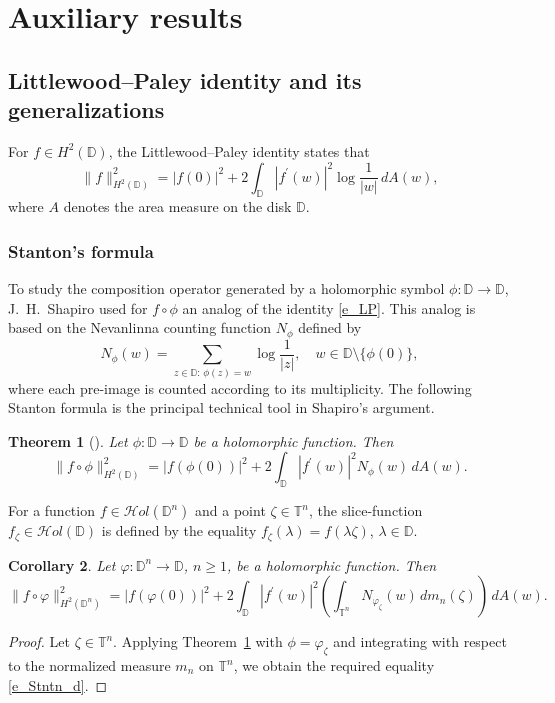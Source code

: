 \documentclass{amsart}
\numberwithin{equation}{section}
\newtheorem{theorem}{Theorem}[section]
\newtheorem{corollary}[theorem]{Corollary}
\theoremstyle{definition}
\newcommand{\neva}{N}
\newcommand{\aream}{A}
\newcommand{\meal}{m_n}
\newcommand{\za}{\zeta}
\newcommand{\ph}{\varphi}
\newcommand{\hol}{\mathcal{H}ol}
\newcommand{\Dbb}{\mathbb D}
\newcommand{\tn}{\mathbb{T}^n}
\newcommand{\dn}{\mathbb{D}^n}
\begin{document}
\section{Auxiliary results}\label{s_aux}
\subsection{Littlewood--Paley identity and its generalizations}\label{ss_HL}

For $f\in H^2(\Dbb)$, the Little\-wood--Paley identity states that
\begin{equation}\label{e_LP}
\|f\|^2_{H^2(\Dbb)} = |f(0)|^2 + 2\int_{\Dbb} |f^\prime(w)|^2 \log\frac{1}{|w|}\, d\aream(w),
\end{equation}
where $\aream$ denotes the area measure on the disk $\Dbb$.


\subsubsection*{Stanton's formula}
To study the composition operator generated by a holomorphic symbol $\phi:\Dbb \to \Dbb$,
J.~H.~Shapiro \cite{ShJoel87} used for $f\circ\phi$ an analog of the identity \eqref{e_LP}.
This analog is based on the Nevanlinna counting function $\neva_\phi$ defined by
\[
\neva_{\phi}(w) = \sum_{z\in \Dbb:\, \phi(z)=w} \log\frac{1}{|z|}, \quad w\in\Dbb\setminus\{\phi(0)\},
\]
where each pre-image is counted according to its multiplicity.
The following Stanton formula is the principal technical tool in Shapiro's argument.

\begin{theorem}[\cite{ShJoel87}]\label{t_Stn_disk}
Let $\phi: \Dbb\to\Dbb$ be a holomorphic function.
Then
\begin{equation}\label{e_Stntn}
\|f\circ \phi\|^2_{H^2(\Dbb)} = |f(\phi(0))|^2 + 2\int_{\Dbb} |f^\prime(w)|^2
\neva_{\phi}(w) \, d\aream(w).
\end{equation}
\end{theorem}

For a function $f\in \hol(\dn)$ and a point $\za\in\tn$, the slice-function
$f_\za\in\hol(\Dbb)$ is defined by the equality $f_\za(\lambda) = f(\lambda\za)$, $\lambda\in\Dbb$.

\begin{corollary}\label{c_Stanton}
Let $\ph: \dn\to\Dbb$, $n\ge 1$, be  a holomorphic function.
Then
\begin{equation}\label{e_Stntn_d}
\|f\circ \ph\|^2_{H^2(\dn)} = |f(\ph(0))|^2 + 2\int_{\Dbb} |f^\prime(w)|^2
\left(\int_{\tn} \neva_{\ph_\za}(w)\,  d\meal(\za) \right)\, d\aream(w).
\end{equation}
\end{corollary}
\begin{proof}
Let $\za\in \tn$.
Applying Theorem~\ref{t_Stn_disk} with $\phi = \ph_\za$ and integrating with respect to  the normalized measure
$\meal$ on $\tn$, we obtain the required equality \eqref{e_Stntn_d}.
\end{proof}
\end{document}
